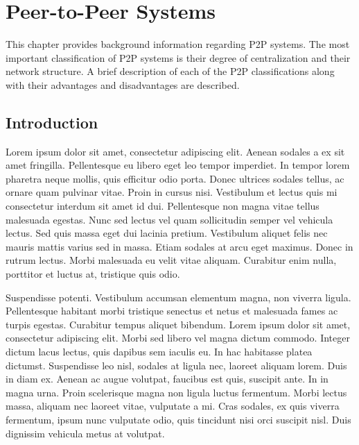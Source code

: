 \chapter{Peer-to-Peer Systems}
\label{chap:P2PSystems}

\ifpdf
    \graphicspath{{Chapter2/Figs/Raster/}{Chapter2/Figs/PDF/}{Chapter2/Figs/}}
\else
    \graphicspath{{Chapter2/Figs/Vector/}{Chapter2/Figs/}}
\fi

This chapter provides background information regarding P2P systems.
The most important classification of P2P systems is their degree of centralization and their network structure.
A brief description of each of the P2P classifications along with their advantages and disadvantages are described.

\section{Introduction}
Lorem ipsum dolor sit amet, consectetur adipiscing elit. Aenean sodales a ex sit amet fringilla. Pellentesque eu libero eget leo tempor imperdiet. In tempor lorem pharetra neque mollis, quis efficitur odio porta. Donec ultrices sodales tellus, ac ornare quam pulvinar vitae. Proin in cursus nisi. Vestibulum et lectus quis mi consectetur interdum sit amet id dui. Pellentesque non magna vitae tellus malesuada egestas. Nunc sed lectus vel quam sollicitudin semper vel vehicula lectus. Sed quis massa eget dui lacinia pretium. Vestibulum aliquet felis nec mauris mattis varius sed in massa. Etiam sodales at arcu eget maximus. Donec in rutrum lectus. Morbi malesuada eu velit vitae aliquam. Curabitur enim nulla, porttitor et luctus at, tristique quis odio.

Suspendisse potenti. Vestibulum accumsan elementum magna, non viverra ligula. Pellentesque habitant morbi tristique senectus et netus et malesuada fames ac turpis egestas. Curabitur tempus aliquet bibendum. Lorem ipsum dolor sit amet, consectetur adipiscing elit. Morbi sed libero vel magna dictum commodo. Integer dictum lacus lectus, quis dapibus sem iaculis eu. In hac habitasse platea dictumst. Suspendisse leo nisl, sodales at ligula nec, laoreet aliquam lorem. Duis in diam ex. Aenean ac augue volutpat, faucibus est quis, suscipit ante. In in magna urna. Proin scelerisque magna non ligula luctus fermentum. Morbi lectus massa, aliquam nec laoreet vitae, vulputate a mi. Cras sodales, ex quis viverra fermentum, ipsum nunc vulputate odio, quis tincidunt nisi orci suscipit nisl. Duis dignissim vehicula metus at volutpat.

